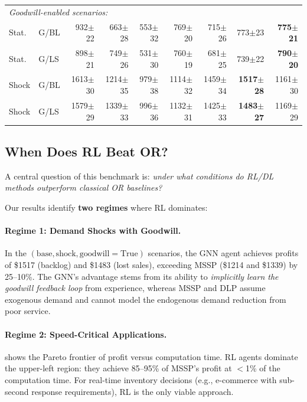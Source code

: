 \documentclass[preprint,12pt]{elsarticle}
\begin{document}
\begin{table}[htbp]
\begin{tabular}{ll rrrrrrr}
\multicolumn{9}{l}{\emph{Goodwill-enabled scenarios:}} \\
Stat. & G/BL & 932{\scriptsize$\pm$22} & 663{\scriptsize$\pm$28} & 553{\scriptsize$\pm$32} & 769{\scriptsize$\pm$20} & 715{\scriptsize$\pm$26} & 773{\scriptsize$\pm$23} & \textbf{775{\scriptsize$\pm$21}} \\
Stat. & G/LS & 898{\scriptsize$\pm$21} & 749{\scriptsize$\pm$26} & 531{\scriptsize$\pm$30} & 760{\scriptsize$\pm$19} & 681{\scriptsize$\pm$25} & 739{\scriptsize$\pm$22} & \textbf{790{\scriptsize$\pm$20}} \\
Shock & G/BL & 1613{\scriptsize$\pm$30} & 1214{\scriptsize$\pm$35} & 979{\scriptsize$\pm$38} & 1114{\scriptsize$\pm$32} & 1459{\scriptsize$\pm$34} & \textbf{1517{\scriptsize$\pm$28}} & 1161{\scriptsize$\pm$30} \\
Shock & G/LS & 1579{\scriptsize$\pm$29} & 1339{\scriptsize$\pm$33} & 996{\scriptsize$\pm$36} & 1132{\scriptsize$\pm$31} & 1425{\scriptsize$\pm$33} & \textbf{1483{\scriptsize$\pm$27}} & 1169{\scriptsize$\pm$29} \\
\bottomrule
\end{tabular}
\end{table}

\subsection{When Does RL Beat OR?}\label{sec:rl_vs_or}

A central question of this benchmark is: \emph{under what conditions do
RL/DL methods outperform classical OR baselines?}

Our results identify \textbf{two regimes} where RL dominates:

\paragraph{Regime 1: Demand Shocks with Goodwill.}
In the $(\text{base}, \text{shock}, \text{goodwill}=\text{True})$
scenarios, the GNN agent achieves profits of \$1517 (backlog) and \$1483
(lost sales), exceeding MSSP (\$1214 and \$1339) by 25--10\%. The GNN's
advantage stems from its ability to \emph{implicitly learn the
goodwill feedback loop} from experience, whereas MSSP and DLP assume
exogenous demand and cannot model the endogenous demand reduction from
poor service.

\paragraph{Regime 2: Speed-Critical Applications.}
 shows the Pareto frontier of profit versus computation
time. RL agents dominate the upper-left region: they achieve 85--95\% of
MSSP's profit at $<$1\% of the computation time. For real-time inventory
decisions (e.g., e-commerce with sub-second response requirements), RL
is the only viable approach.
\end{document}
